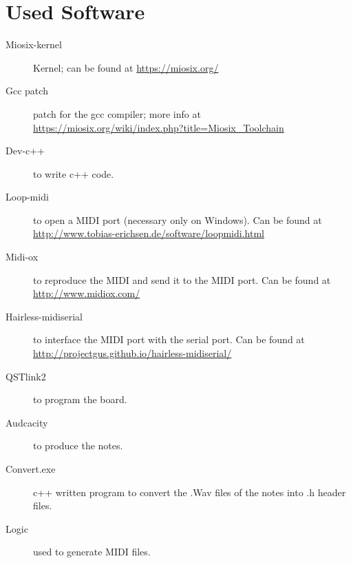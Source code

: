 \documentclass[12pt]{article}
\begin{document}
\section{Used Software} \label{sec:used}
\begin{description} 
	\item[Miosix-kernel] Kernel; can be found at \url{https://miosix.org/}
	\item[Gcc patch] patch for the gcc compiler; more info at \url{https://miosix.org/wiki/index.php?title=Miosix_Toolchain}
	\item[Dev-c++] to write c++  code.
	\item[Loop-midi] to open a MIDI port (necessary only on Windows). Can be found at \url{http://www.tobias-erichsen.de/software/loopmidi.html}
	\item[Midi-ox] to reproduce the MIDI and send it to the MIDI port. Can be found at \url{http://www.midiox.com/}
	\item[Hairless-midiserial] to interface the MIDI port with the serial port. Can be found at \url{http://projectgus.github.io/hairless-midiserial/}
	\item[QSTlink2] to program the board.
	\item[Audcacity] to produce the notes.
	\item[Convert.exe] c++ written program to convert the .Wav files  of the notes into .h header files.
	\item[Logic] used to generate MIDI files.
\end{description}
\end{document}
